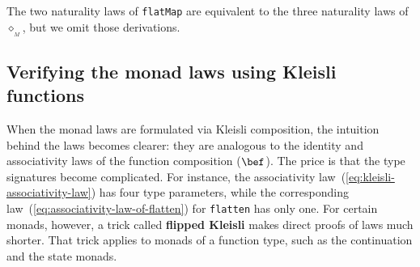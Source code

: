 \begin{comment}
Require two additional laws that connect $\diamond$, $\text{fmap}$,
and $\bef$:

Right naturality: $f^{A\rightarrow S^{B}}\bef\text{fmap}\,g^{B\rightarrow C}=f\diamond\left(g\bef\text{pure}\right)$

So, can define fmap through Kleisli: $\text{fmap}\,g^{A\rightarrow B}\equiv\text{id}^{S^{A}\rightarrow S^{A}}\diamond\left(g\bef\text{pure}\right)$

The laws for pure and flatMap then follow from category axioms for
Kleisli:

Left and right identity laws follow from $\text{id}\diamond\text{pure}=\text{id}$
and $\text{pure}\diamond f=f$ 

Associativity for flatMap follows from $\left(\text{id}\diamond f\right)\diamond g=\text{id}\diamond\left(f\diamond g\right)$

Use \textsf{``}left naturality\textsf{''}, get: $\left(f\bef g\right)\diamond h=\left(f\bef pure\right)\diamond g\diamond h=f\bef\left(g\diamond h\right)$

Naturality for pure: $\text{pure}\bef\text{fmap}\,f=\text{pure}\diamond\left(f\bef\text{pure}\right)=f\bef\text{pure}$

Define flatten: $\text{ftn}=\text{id}^{S^{S^{A}}\rightarrow S^{S^{A}}}\diamond\text{id}^{S^{A}\rightarrow S^{A}}$

Naturality for flatten: $\text{ftn}\bef\text{fmap}\,f=\text{id}\diamond\text{id}\diamond\left(f\bef\text{pure}\right)=\text{id}\diamond\text{fmap}\,f$
and $\text{fmap}\left(\text{fmap}\,f\right)\bef\text{ftn}=\text{id}\diamond\left(\left(\text{fmap}\,f\right)\bef\text{pure}\right)\bef\text{id}\diamond\text{id}=\text{id}\diamond\text{fmap}\,f$
\end{comment}

The two naturality laws of \lstinline!flatMap! are equivalent to
the three naturality laws of $\diamond_{_{M}}$, but we omit those
derivations. 

\subsection{Verifying the monad laws using Kleisli functions}

When the monad laws are formulated via Kleisli composition, the intuition
behind the laws becomes clearer: they are analogous to the identity
and associativity laws of the function composition ($\bef$). The
price is that the type signatures become complicated. For instance,
the associativity law~(\ref{eq:kleisli-associativity-law}) has four
type parameters, while the corresponding law~(\ref{eq:associativity-law-of-flatten})
for \lstinline!flatten! has only one. For certain monads, however,
a trick called \textbf{flipped
Kleisli} makes direct proofs of laws much shorter. That trick applies
to monads of a function type, such as the continuation and the state
monads.

